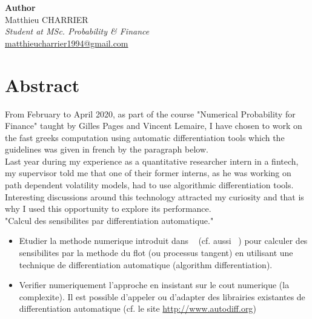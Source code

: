 \documentclass {article}
\begin{document}
\begin{titlepage}
		\begin{minipage}[c]{12cm}
			\bigbreak
			\bigbreak
			\bigbreak
			\bigbreak
			\bigbreak
			\bigbreak
			\bigbreak
			\huge{\textbf{Author}} \\
			\LARGE{Matthieu CHARRIER} \\
			\textit{Student at MSc. Probability \& Finance} \\
			\underline{matthieucharrier1994@gmail.com} \\
		\end{minipage}
		
	\end{titlepage}
	
	\tableofcontents
	
	\newpage
	
	\section {Abstract}
	
	From February to April 2020, as part of the course "Numerical Probability for Finance" taught by Gilles Pages and Vincent Lemaire,
	I have chosen to work on the fast greeks computation using automatic differentiation tools which the guidelines was given in french by the paragraph below. \\
	Last year during my experience as a quantitative researcher intern in a fintech, my supervisor told me that one of their former 
	interns, as he was working on path dependent volatility models, had to use algorithmic differentiation tools. \\
	Interesting discussions around this technology attracted my curiosity and that is why I used this opportunity to explore its 
	performance.\\
	\break
	"Calcul des sensibilites par differentiation automatique."
	\begin{itemize}
		\item
			Etudier la methode numerique introduit dans ~\cite{21} (cf. aussi ~\cite{22}) pour calculer des sensibilites par la 
			methode du flot (ou processus tangent) en utilisant une technique de differentiation automatique 
			(algorithm differentiation).
		\item
			Verifier numeriquement l'approche en insistant sur le cout numerique (la complexite). Il est possible d'appeler ou 
			d'adapter des librairies existantes de differentiation automatique (cf. le site \url{http://www.autodiff.org})
	\end{itemize}
	
\end{document}
